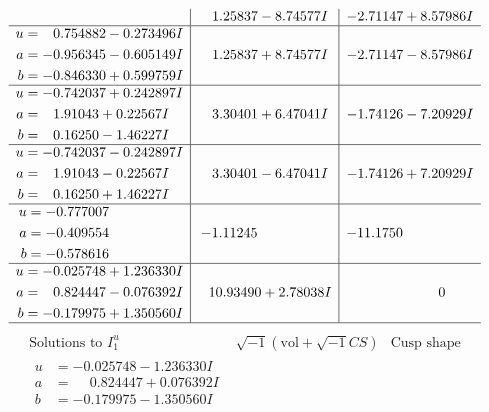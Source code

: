 \documentclass[1p]{elsarticle_modified}
\theoremstyle{definition}
\newcommand{\I}{\sqrt{-1}}
\begin{document}
$$\begin{array}{c|c|c}
 & \phantom{-}1.25837 - 8.74577 I & -2.71147 + 8.57986 I \\ \hline\begin{aligned}
u &= \phantom{-}0.754882 - 0.273496 I \\
a &= -0.956345 - 0.605149 I \\
b &= -0.846330 + 0.599759 I\end{aligned}
 & \phantom{-}1.25837 + 8.74577 I & -2.71147 - 8.57986 I \\ \hline\begin{aligned}
u &= -0.742037 + 0.242897 I \\
a &= \phantom{-}1.91043 + 0.22567 I \\
b &= \phantom{-}0.16250 - 1.46227 I\end{aligned}
 & \phantom{-}3.30401 + 6.47041 I & -1.74126 - 7.20929 I \\ \hline\begin{aligned}
u &= -0.742037 - 0.242897 I \\
a &= \phantom{-}1.91043 - 0.22567 I \\
b &= \phantom{-}0.16250 + 1.46227 I\end{aligned}
 & \phantom{-}3.30401 - 6.47041 I & -1.74126 + 7.20929 I \\ \hline\begin{aligned}
u &= -0.777007\phantom{ +0.000000I} \\
a &= -0.409554\phantom{ +0.000000I} \\
b &= -0.578616\phantom{ +0.000000I}\end{aligned}
 & -1.11245\phantom{ +0.000000I} & -11.1750\phantom{ +0.000000I} \\ \hline\begin{aligned}
u &= -0.025748 + 1.236330 I \\
a &= \phantom{-}0.824447 - 0.076392 I \\
b &= -0.179975 + 1.350560 I\end{aligned}
 & \phantom{-}10.93490 + 2.78038 I & \phantom{-0.000000 } 0\\
 \hline 
 \end{array}$$\newpage$$\begin{array}{c|c|c}  
\text{Solutions to }I^u_{1}& \I (\text{vol} + \sqrt{-1}CS) & \text{Cusp shape}\\
 \hline 
\begin{aligned}
u &= -0.025748 - 1.236330 I \\
a &= \phantom{-}0.824447 + 0.076392 I \\
b &= -0.179975 - 1.350560 I\end{aligned}

\end{array}$$
\end{document}
